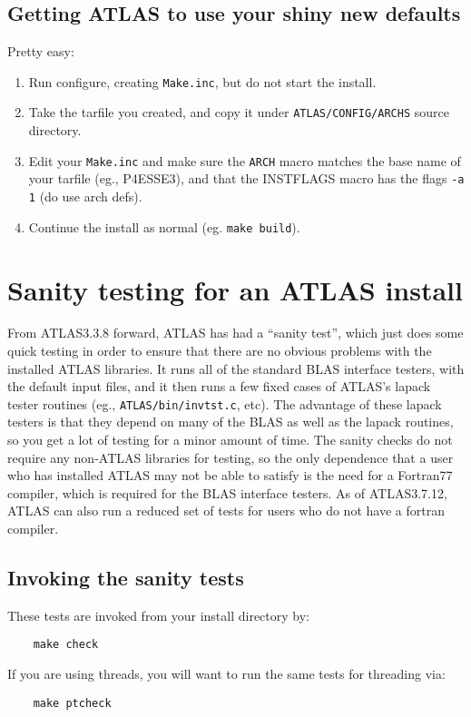 \documentclass[11pt]{article}
\begin{document}
\subsection{Getting ATLAS to use your shiny new defaults}
Pretty easy:  
\begin{enumerate}
\item Run configure, creating {\tt Make.inc}, but do not start the install.
\item Take the tarfile you created, and copy it under
   {\tt ATLAS/CONFIG/ARCHS} source directory.  
\item Edit your {\tt Make.inc} and make sure the {\tt ARCH} macro matches
      the base name of your tarfile (eg., P4ESSE3), and that the INSTFLAGS
      macro has the flags {\tt -a 1} (do use arch defs).
\item Continue the install as normal (eg. {\tt make build}).
\end{enumerate}

\section{Sanity testing for an ATLAS install}
From ATLAS3.3.8 forward, ATLAS has had a ``sanity test'', which just does
some quick testing in order to ensure that there are no obvious problems
with the installed ATLAS libraries.  It runs all of the standard BLAS interface
testers, with the default input files, and it then runs a few fixed cases
of ATLAS's lapack tester routines (eg., {\tt ATLAS/bin/invtst.c}, etc).  The
advantage of these lapack testers is that they depend on many of
the BLAS as well as the lapack routines, so you get a lot of testing for
a minor amount of time.  The sanity checks do not require any non-ATLAS
libraries for testing, so the only dependence that a user who has installed
ATLAS may not be able to satisfy is the need for a Fortran77
compiler, which is required for the BLAS interface testers.
As of ATLAS3.7.12, ATLAS can also run a reduced set of tests for users
who do not have a fortran compiler.

\subsection{Invoking the sanity tests}
These tests are invoked from your install directory by:
\begin{verbatim}
    make check
\end{verbatim}

If you are using threads, you will want to run the same tests for threading
via:
\begin{verbatim}
    make ptcheck
\end{verbatim}
\end{document}
